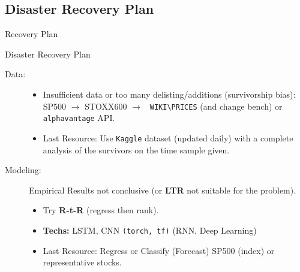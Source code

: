 \documentclass[ucs,8pt,handout]{beamer}
\begin{document}
\subsection{Disaster Recovery Plan}
\begin{frame}{Recovery Plan}
  \begin{block}{Disaster Recovery Plan}
    \begin{description}
    \item[Data:]
      \begin{itemize}
      \item Insufficient data or too many delisting/additions
        (survivorship bias): SP500 $\to$ STOXX600 $\to$ {\tt
        WIKI\textbackslash PRICES} (and change bench) or {\tt
        alphavantage} API.
      \item Last Resource: Use {\tt Kaggle} dataset (updated
        daily) with a complete analysis of the survivors on the
        time sample given.
      \end{itemize}
    \item[Modeling:] Empirical Results not conclusive (or {\bf LTR} not suitable
        for the problem).  
      \begin{itemize}
      \item Try {\bf R-t-R} (regress then rank).
      \item {\bf Techs:} {\sc LSTM, CNN} {\tt (torch, tf)} (RNN, Deep
        Learning)
        \item Last Resource: Regress or Classify (Forecast) SP500
          (index) or representative stocks. 
      \end{itemize}
    \end{description}
  \end{block}
\end{frame}
\end{document}
